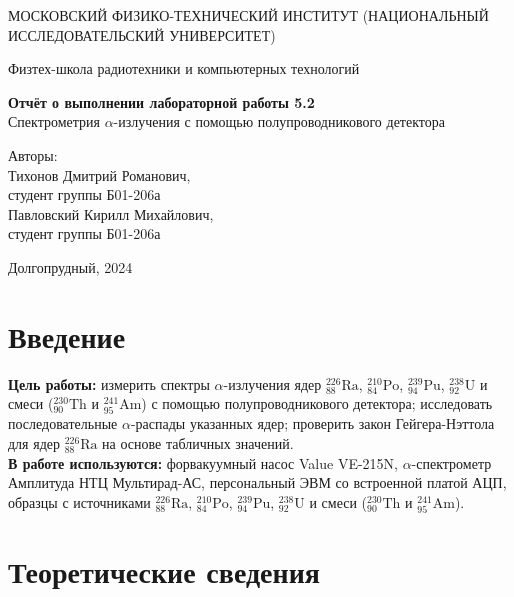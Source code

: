 \documentclass[a4paper, 12pt]{article}
\newcommand{\elem}[3]{{}^{#2}_{#3}\text{#1}}
\newcommand{\Ra}{\elem{Ra}{226}{88}}
\newcommand{\Pu}{\elem{Pu}{239}{94}}
\newcommand{\Po}{\elem{Po}{210}{84}}
\newcommand{\Ua}{\elem{U}{238}{92}}
\newcommand{\Th}{\elem{Th}{230}{90}}
\newcommand{\Am}{\elem{Am}{241}{95}}
\begin{document}
    \begin{titlepage}
	\begin{center}
            {\large МОСКОВСКИЙ ФИЗИКО-ТЕХНИЧЕСКИЙ ИНСТИТУТ (НАЦИОНАЛЬНЫЙ ИССЛЕДОВАТЕЛЬСКИЙ УНИВЕРСИТЕТ)}
	\end{center}
 
	\begin{center}
		{\large Физтех-школа радиотехники и компьютерных технологий}
	\end{center}
	
	\vspace{8cm}
	{\LARGE
		\begin{center}
                {\bf Отчёт о выполнении лабораторной работы 5.2}\\
                Спектрометрия $\alpha$-излучения с помощью полупроводникового детектора
		\end{center}
	}
	\vspace{4cm}
	\begin{flushright}
		{\Large Авторы: \\ 
        Тихонов Дмитрий Романович, \\ студент группы Б01-206а \\
        Павловский Кирилл Михайлович, \\ студент группы Б01-206а}
	\end{flushright}
	\vspace{4cm}
	\begin{center}
		\Large Долгопрудный, 2024
	\end{center}
    \end{titlepage}


    \section{Введение}

    \noindent \textbf{Цель работы:} измерить спектры $\alpha$-излучения ядер $\Ra$, $\Po$, $\Pu$, $\Ua$ и смеси ($\Th$ и $\Am$) с помощью полупроводникового детектора; исследовать последовательные $\alpha$-распады указанных ядер; проверить закон Гейгера-Нэттола для ядер $\Ra$ на основе табличных значений. \\
	

    \noindent \textbf{В работе используются:} форвакуумный насос Value VE-215N, $\alpha$-спектрометр Амплитуда НТЦ Мультирад-АС, персональный ЭВМ со встроенной платой АЦП, образцы с источниками $\Ra$, $\Po$, $\Pu$, $\Ua$ и смеси ($\Th$ и $\Am$).
    
    \section{Теоретические сведения}
    
\end{document}

